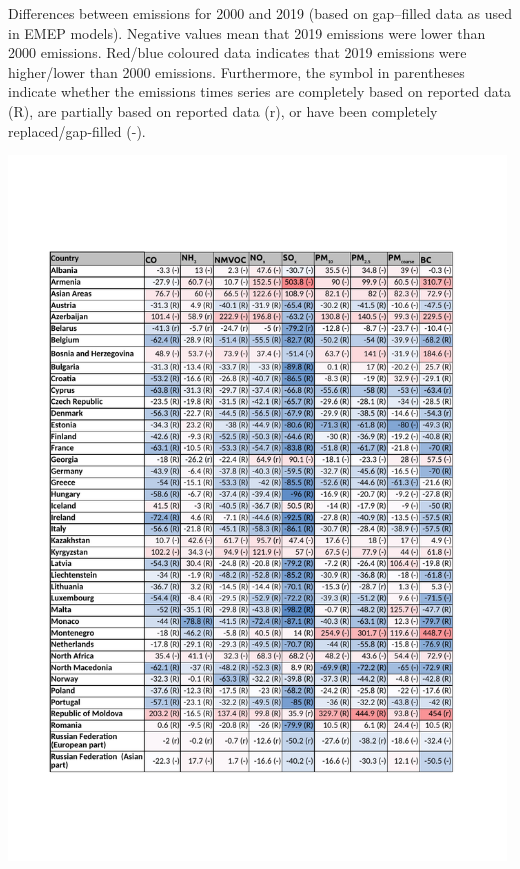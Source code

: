 \begin{table}
  \caption{Differences between emissions for 2000 and 2019 (based on gap--filled data as used in EMEP models). Negative values mean that 2019 emissions were lower than 2000 emissions. Red/blue coloured data indicates that 2019 emissions were higher/lower than 2000 emissions. Furthermore, the symbol in parentheses indicate whether the emissions times series are completely based on reported data (R), are partially based on reported data (r), or have been completely replaced/gap-filled (-).}
\centering
{\includegraphics*[viewport=45 100 535 735,clip,width=0.99\textwidth]{FIGS_CEIP/Table3_page1.pdf}}
\label{tab:CEIP3}  
\end{table}

